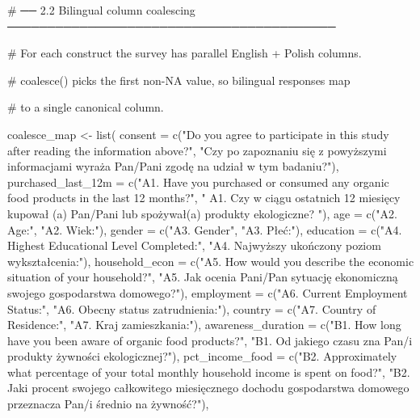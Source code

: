 \documentclass[
  letterpaper,
  DIV=11,
  numbers=noendperiod]{scrartcl}
\newenvironment{Shaded}{\begin{snugshade}}{\end{snugshade}}
\newcommand{\AttributeTok}[1]{\textcolor[rgb]{0.40,0.45,0.13}{#1}}
\newcommand{\CommentTok}[1]{\textcolor[rgb]{0.37,0.37,0.37}{#1}}
\newcommand{\FunctionTok}[1]{\textcolor[rgb]{0.28,0.35,0.67}{#1}}
\newcommand{\NormalTok}[1]{\textcolor[rgb]{0.00,0.23,0.31}{#1}}
\newcommand{\OtherTok}[1]{\textcolor[rgb]{0.00,0.23,0.31}{#1}}
\newcommand{\StringTok}[1]{\textcolor[rgb]{0.13,0.47,0.30}{#1}}
\begin{document}
\begin{Shaded}
\begin{Highlighting}[]
\CommentTok{\# ── 2.2  Bilingual column coalescing ─────────────────────────────────────────}

\CommentTok{\# For each construct the survey has parallel English + Polish columns.}

\CommentTok{\# coalesce() picks the first non{-}NA value, so bilingual responses map}

\CommentTok{\# to a single canonical column.}

\NormalTok{coalesce\_map }\OtherTok{\textless{}{-}} \FunctionTok{list}\NormalTok{(}
  \AttributeTok{consent =} \FunctionTok{c}\NormalTok{(}\StringTok{"Do you agree to participate in this study after reading the information above?"}\NormalTok{, }\StringTok{"Czy po zapoznaniu się z powyższymi informacjami wyraża Pan/Pani zgodę na udział w tym badaniu?"}\NormalTok{),}
  \AttributeTok{purchased\_last\_12m    =} \FunctionTok{c}\NormalTok{(}\StringTok{"A1. Have you purchased or consumed any organic food products in the last 12 months?"}\NormalTok{, }\StringTok{"  A1. Czy w ciągu ostatnich 12 miesięcy kupował (a) Pan/Pani lub spożywał(a) produkty ekologiczne?  "}\NormalTok{),}
  \AttributeTok{age =} \FunctionTok{c}\NormalTok{(}\StringTok{"A2. Age:"}\NormalTok{, }\StringTok{"A2. Wiek:"}\NormalTok{),}
  \AttributeTok{gender =} \FunctionTok{c}\NormalTok{(}\StringTok{"A3. Gender"}\NormalTok{, }\StringTok{"A3. Płeć:"}\NormalTok{),}
  \AttributeTok{education =} \FunctionTok{c}\NormalTok{(}\StringTok{"A4. Highest Educational Level Completed:"}\NormalTok{, }\StringTok{"A4. Najwyższy ukończony poziom wykształcenia:"}\NormalTok{),}
  \AttributeTok{household\_econ =} \FunctionTok{c}\NormalTok{(}\StringTok{"A5. How would you describe the economic situation of your household?"}\NormalTok{, }\StringTok{"A5. Jak ocenia Pani/Pan sytuację ekonomiczną swojego gospodarstwa domowego?"}\NormalTok{),}
  \AttributeTok{employment =} \FunctionTok{c}\NormalTok{(}\StringTok{"A6. Current Employment Status:"}\NormalTok{, }\StringTok{"A6. Obecny status zatrudnienia:"}\NormalTok{),}
  \AttributeTok{country =} \FunctionTok{c}\NormalTok{(}\StringTok{"A7. Country of Residence:"}\NormalTok{, }\StringTok{"A7. Kraj zamieszkania:"}\NormalTok{),}
  \AttributeTok{awareness\_duration =} \FunctionTok{c}\NormalTok{(}\StringTok{"B1. How long have you been aware of organic food products?"}\NormalTok{, }\StringTok{"B1. Od jakiego czasu zna Pan/i produkty żywności ekologicznej?"}\NormalTok{),}
  \AttributeTok{pct\_income\_food =} \FunctionTok{c}\NormalTok{(}\StringTok{"B2. Approximately what percentage of your total monthly household income is spent on food?"}\NormalTok{, }\StringTok{"B2. Jaki procent swojego całkowitego miesięcznego dochodu gospodarstwa domowego przeznacza Pan/i średnio na żywność?"}\NormalTok{),}

\end{Highlighting}
\end{Shaded}
\end{document}
